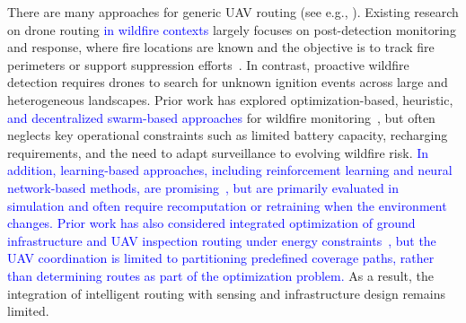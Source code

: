 \documentclass[pdflatex,sn-mathphys-num]{sn-jnl}%
\theoremstyle{thmstyleone}%
\theoremstyle{thmstyletwo}%
\theoremstyle{thmstylethree}%
\newcommand{\blue}[1]{\textcolor{blue}{#1}}
\begin{document}
There are many approaches for generic UAV routing (see e.g., \cite{s23031463, drones9040263, s23031463}). Existing research on drone routing \blue{in wildfire contexts} largely focuses on post-detection monitoring and response, where fire locations are known and the objective is to track fire perimeters or support suppression efforts~\citep{WildfireMonitoringBailonruiz22,DroneroutingPostGhamry17}. In contrast, proactive wildfire detection requires drones to search for unknown ignition events across large and heterogeneous landscapes. Prior work has explored optimization-based, heuristic, \blue{and decentralized swarm-based approaches} for wildfire monitoring~\citep{DroneroutingDeLaFuente,fire7070254,DroneroutingXu, Tzoumas2023, DroneroutingJemmali}, 
but often neglects key operational constraints such as limited battery capacity, recharging requirements, and the need to adapt surveillance to evolving wildfire risk. \blue{In addition, learning-based approaches, including reinforcement learning and neural network-based methods, are promising~\cite{Demir2024, Pordal2025}, but are primarily evaluated in simulation and often require recomputation or retraining when the environment changes. 
Prior work has also considered integrated optimization of ground infrastructure and UAV inspection routing under energy constraints~\citep{Liu2025}, but the UAV coordination is limited to partitioning predefined coverage paths, rather than determining routes as part of the optimization problem. } As a result, the integration of intelligent routing with sensing and infrastructure design remains limited.

\end{document}
